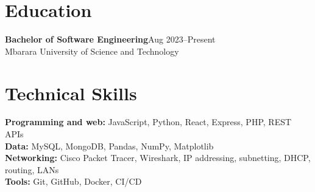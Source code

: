 \documentclass[10pt,a4paper]{article}
\begin{document}
\section{Education}
\textbf{Bachelor of Software Engineering}\hfill{\small\color{muted}Aug 2023--Present}\\
Mbarara University of Science and Technology

\section{Technical Skills}
\textbf{Programming and web:} JavaScript, Python, React, Express, PHP, REST APIs\\
\textbf{Data:} MySQL, MongoDB, Pandas, NumPy, Matplotlib\\
\textbf{Networking:} Cisco Packet Tracer, Wireshark, IP addressing, subnetting, DHCP, routing, LANs\\
\textbf{Tools:} Git, GitHub, Docker, CI/CD
\end{document}
